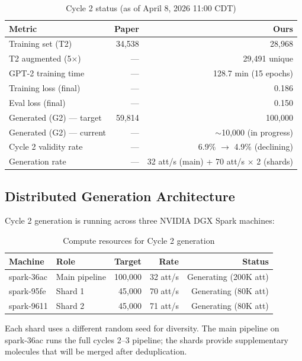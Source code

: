 \documentclass[11pt]{article}
\begin{document}
\begin{table}[H]
\centering
\caption{Cycle 2 status (as of April 8, 2026 11:00 CDT)}
\label{tab:cycle2}
\begin{tabular}{@{}lrr@{}}
\toprule
\textbf{Metric} & \textcolor{paperblue}{\textbf{Paper}} & \textcolor{oursred}{\textbf{Ours}} \\
\midrule
Training set (T2) & 34,538 & 28,968 \\
T2 augmented (5$\times$) & --- & 29,491 unique \\
GPT-2 training time & --- & 128.7 min (15 epochs) \\
Training loss (final) & --- & 0.186 \\
Eval loss (final) & --- & 0.150 \\
\midrule
Generated (G2) --- target & 59,814 & 100,000 \\
Generated (G2) --- current & --- & $\sim$10,000 (in progress) \\
Cycle 2 validity rate & --- & 6.9\% $\to$ 4.9\% (declining) \\
Generation rate & --- & 32 att/s (main) + 70 att/s $\times$ 2 (shards) \\
\bottomrule
\end{tabular}
\end{table}

\subsection{Distributed Generation Architecture}

Cycle 2 generation is running across three NVIDIA DGX Spark machines:

\begin{table}[H]
\centering
\caption{Compute resources for Cycle 2 generation}
\label{tab:compute}
\small
\begin{tabular}{@{}llrrr@{}}
\toprule
\textbf{Machine} & \textbf{Role} & \textbf{Target} & \textbf{Rate} & \textbf{Status} \\
\midrule
spark-36ac & Main pipeline & 100,000 & 32 att/s & Generating (200K att) \\
spark-95fe & Shard 1 & 45,000 & 70 att/s & Generating (80K att) \\
spark-9611 & Shard 2 & 45,000 & 71 att/s & Generating (80K att) \\
\bottomrule
\end{tabular}
\end{table}

\noindent Each shard uses a different random seed for diversity. The main pipeline on spark-36ac runs the full cycles 2--3 pipeline; the shards provide supplementary molecules that will be merged after deduplication.
\end{document}
